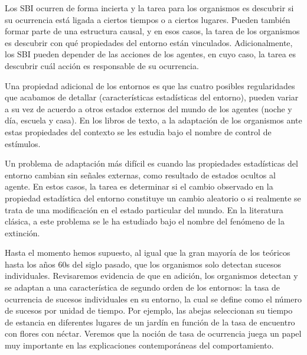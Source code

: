 \documentclass[
  a4paper,
  DIV=11,
  numbers=noendperiod]{scrreprt}
\begin{document}
Los SBI ocurren de forma incierta y la tarea para los organismos es
descubrir si su ocurrencia está ligada a ciertos tiempos o a ciertos
lugares. Pueden también formar parte de una estructura causal, y en esos
casos, la tarea de los organismos es descubrir con qué propiedades del
entorno están vinculados. Adicionalmente, los SBI pueden depender de las
acciones de los agentes, en cuyo caso, la tarea es descubrir cuál acción
es responsable de su ocurrencia.

Una propiedad adicional de los entornos es que las cuatro posibles
regularidades que acabamos de detallar (características estadísticas del
entorno), pueden variar a su vez de acuerdo a otros estados externos del
mundo de los agentes (noche y día, escuela y casa). En los libros de
texto, a la adaptación de los organismos ante estas propiedades del
contexto se les estudia bajo el nombre de control de estímulos.

Un problema de adaptación más difícil es cuando las propiedades
estadísticas del entorno cambian sin señales externas, como resultado de
estados ocultos al agente. En estos casos, la tarea es determinar si el
cambio observado en la propiedad estadística del entorno constituye un
cambio aleatorio o si realmente se trata de una modificación en el
estado particular del mundo. En la literatura clásica, a este problema
se le ha estudiado bajo el nombre del fenómeno de la extinción.

Hasta el momento hemos supuesto, al igual que la gran mayoría de los
teóricos hasta los años 60s del siglo pasado, que los organismos solo
detectan sucesos individuales. Revisaremos evidencia de que en adición,
los organismos detectan y se adaptan a una característica de segundo
orden de los entornos: la tasa de ocurrencia de sucesos individuales en
su entorno, la cual se define como el número de sucesos por unidad de
tiempo. Por ejemplo, las abejas seleccionan su tiempo de estancia en
diferentes lugares de un jardín en función de la tasa de encuentro con
flores con néctar. Veremos que la noción de tasa de ocurrencia juega un
papel muy importante en las explicaciones contemporáneas del
comportamiento.
\end{document}
